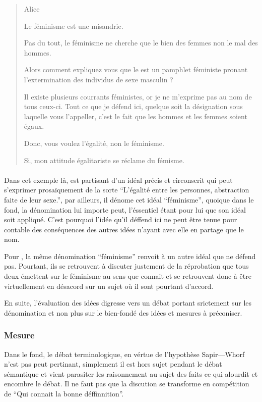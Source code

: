 \begin{quote}
  \begin{drama}{0cm}{0cm}{Alice}

    \Aspeaks Le féminisme est une misandrie.

    \Bspeaks Pas du tout, le féminisme ne cherche que le bien des femmes non le mal des hommes.

    \Aspeaks Alors comment expliquez vous que le  est un pamphlet féministe pronant l’extermination des individus de sexe masculin ?

    \Bspeaks Il existe plusieurs courrants féministes, or je ne m’exprime pas au nom de tous ceux-ci. Tout ce que je défend ici, quelque soit la désignation sous laquelle vous l’appeller, c’est le fait que les hommes et les femmes soient égaux.

    \Aspeaks Donc, vous voulez l’égalité, non le féminisme.

    \Bspeaks Si, mon attitude égalitariste se réclame du fémisme.

  \end{drama}
\end{quote}

\paragraph{}
Dans cet exemple là, \B est partisant d’un idéal précis et circonscrit qui peut s’exprimer prosaïquement de la sorte \enquote{L’égalité entre les personnes, abstraction faite de leur sexe.}, par ailleurs, il dénome cet idéal \enquote{féminisme}, quoique dans le fond, la dénomination lui importe peut, l’éssentiel étant pour lui que son idéal soit appliqué.
C’est pourquoi l’idée qu’il déffend ici ne peut être tenue pour contable des conséquences des autres idées n’ayant avec elle en partage que le nom.

Pour \A, la même dénomination \enquote{féminisme} renvoit à un autre idéal que \B ne défend pas. Pourtant, ils se retrouvent à discuter justement de la réprobation que tous deux émettent sur le féminisme au sens que connait \A et se retrouvent donc à être virtuellement en désacord sur un sujet où il sont pourtant d’accord.

En suite, l’évaluation des idées digresse vers un débat portant srictement sur les dénomination et non plus sur le bien-fondé des idées et mesures à préconiser.


\subsubsection{Mesure}
Dans le fond, le débat terminologique, en vértue de l’hypothèse Sapir—Whorf n’est pas peut pertinant, simplement il est hors sujet pendant le débat sémantique et vient parasiter les raisonnement au sujet des faits ce qui alourdit et encombre le débat. Il ne faut pas que la discution se transforme en compétition de \enquote{Qui connait la bonne déffinnition}.

